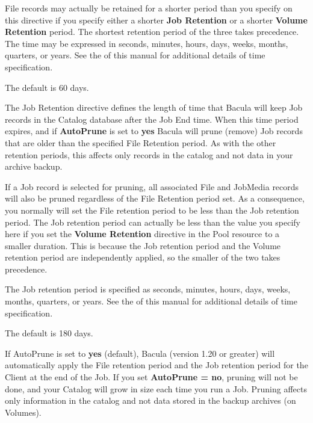 \begin{description}
   File records  may actually be retained for a shorter period than you specify
   on  this directive if you specify either a shorter {\bf Job Retention}  or a
   shorter {\bf Volume Retention} period. The shortest  retention period of the
   three takes precedence.  The time may be expressed in seconds, minutes, 
   hours, days, weeks, months, quarters, or years. See the 
    of this  manual for
   additional details of time specification. 

   The  default is 60 days. 

\label{JobRetention}
\item [Job Retention = \lt{}time-period-specification\gt{}]
   The Job Retention directive defines the length of time that  Bacula will keep
   Job records in the Catalog database after the Job End time.  When
   this time period expires, and if {\bf AutoPrune} is set to {\bf yes}
   Bacula will prune (remove) Job records that are older than the specified
   File Retention period.  As with the other retention periods, this
   affects only records in the catalog and not data in your archive backup.

   If a Job record is selected for pruning, all associated File and JobMedia
   records will also be pruned regardless of the File Retention period set.
   As a consequence, you normally will set the File retention period to be
   less than the Job retention period.  The Job retention period can actually
   be less than the value you specify here if you set the {\bf Volume
   Retention} directive in the Pool resource to a smaller duration.  This is
   because the Job retention period and the Volume retention period are
   independently applied, so the smaller of the two takes precedence.

   The Job retention period is specified as seconds,  minutes, hours, days,
   weeks, months,  quarters, or years.  See the 
    of this manual for
   additional details of  time specification.  

   The default is 180 days.  

\label{AutoPrune}
\item [AutoPrune = \lt{}yes\vb{}no\gt{}]
   If AutoPrune is set to  {\bf yes} (default), Bacula (version 1.20 or greater)
   will  automatically apply the File retention period and the Job  retention
   period for the Client at the end of the Job.  If you set {\bf AutoPrune = no},
   pruning will not be done,  and your Catalog will grow in size each time you
   run a Job.  Pruning affects only information in the catalog and not data 
   stored in the backup archives (on Volumes).  


\end{description}
